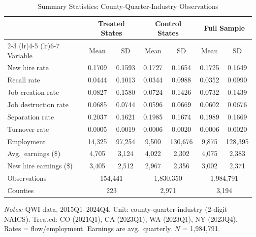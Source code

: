 \begin{table}[H]
\centering
\caption{Summary Statistics: County-Quarter-Industry Observations}
\label{tab:summary}
\footnotesize
\begin{tabular}{lcccccc}
\toprule
 & \multicolumn{2}{c}{Treated States} & \multicolumn{2}{c}{Control States} & \multicolumn{2}{c}{Full Sample} \\
\cmidrule(lr){2-3} \cmidrule(lr){4-5} \cmidrule(lr){6-7}
Variable & Mean & SD & Mean & SD & Mean & SD \\
\midrule
New hire rate & 0.1709 & 0.1593 & 0.1727 & 0.1654 & 0.1725 & 0.1649 \\
Recall rate & 0.0444 & 0.1013 & 0.0344 & 0.0988 & 0.0352 & 0.0990 \\
Job creation rate & 0.0827 & 0.1580 & 0.0724 & 0.1426 & 0.0732 & 0.1439 \\
Job destruction rate & 0.0685 & 0.0744 & 0.0596 & 0.0669 & 0.0602 & 0.0676 \\
Separation rate & 0.2037 & 0.1621 & 0.1985 & 0.1674 & 0.1989 & 0.1669 \\
Turnover rate & 0.0005 & 0.0019 & 0.0006 & 0.0020 & 0.0006 & 0.0020 \\
Employment & 14,325 & 97,254 & 9,500 & 130,676 & 9,875 & 128,395 \\
Avg.\ earnings (\$) & 4,705 & 3,124 & 4,022 & 2,302 & 4,075 & 2,383 \\
New hire earnings (\$) & 3,405 & 2,512 & 2,967 & 2,356 & 3,002 & 2,371 \\
\midrule
Observations & \multicolumn{2}{c}{154,441} & \multicolumn{2}{c}{1,830,350} & \multicolumn{2}{c}{1,984,791} \\
Counties & \multicolumn{2}{c}{223} & \multicolumn{2}{c}{2,971} & \multicolumn{2}{c}{3,194} \\
\bottomrule
\end{tabular}
\par\vspace{0.3em}
{\footnotesize \textit{Notes:} QWI data, 2015Q1--2024Q4. Unit: county-quarter-industry (2-digit NAICS). Treated: CO (2021Q1), CA (2023Q1), WA (2023Q1), NY (2023Q4). Rates = flow/employment. Earnings are avg.\ quarterly. $N$ = 1,984,791.}
\end{table}
